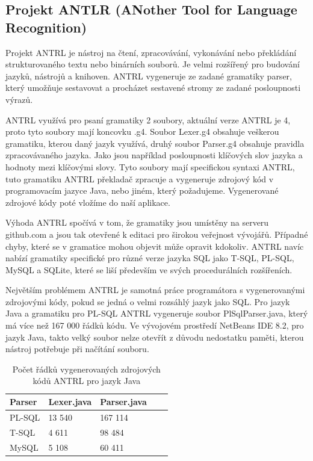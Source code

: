 \documentclass[czech,bachelor,public,dept460,male,cpdeclaration,twoside]{diploma}
\begin{document}
\subsection{Projekt ANTLR (ANother Tool for Language Recognition)}
Projekt ANTRL je nástroj na čtení, zpracovávání, vykonávání nebo překládání strukturovaného textu nebo binárních souborů. Je velmi rozšířený pro budování jazyků, nástrojů a knihoven. ANTRL vygeneruje ze zadané gramatiky parser, který umožňuje sestavovat a procházet sestavené stromy ze zadané posloupnosti výrazů. \cite{antrl}



ANTRL využívá pro psaní gramatiky 2 soubory, aktuální verze ANTRL je 4, proto tyto soubory mají koncovku .g4. Soubor Lexer.g4 obsahuje veškerou gramatiku, kterou daný jazyk využívá, druhý soubor Parser.g4 obsahuje pravidla zpracovávaného jazyka. Jako jsou například posloupnosti klíčových slov jazyka a hodnoty mezi klíčovými slovy. Tyto soubory mají specifickou syntaxi ANTRL, tuto gramatiku ANTRL překladač zpracuje a vygeneruje zdrojový kód v programovacím jazyce Java, nebo jiném, který požadujeme. Vygenerované zdrojové kódy poté vložíme do naší aplikace. \cite{antrldocs}



Výhoda ANTRL spočívá v tom, že gramatiky jsou umístěny na serveru github.com a jsou tak otevřené k editaci pro širokou veřejnost vývojářů. Případné chyby, které se v gramatice mohou objevit může opravit kdokoliv. ANTRL navíc nabízí gramatiky specifické pro různé verze jazyka SQL jako T-SQL, PL-SQL, MySQL a SQLite, které se liší především ve svých procedurálních rozšířeních. \cite{antrlg}



Největším problémem ANTRL je samotná práce programátora s vygenerovanými zdrojovými kódy, pokud se jedná o velmi rozsáhlý jazyk jako SQL. Pro jazyk Java a gramatiku pro PL-SQL ANTRL vygeneruje soubor PlSqlParser.java, který má více než 167 000 řádků kódu. Ve vývojovém prostředí NetBeans IDE 8.2, pro jazyk Java, takto velký soubor nelze otevřít z důvodu nedostatku paměti, kterou nástroj potřebuje při načítání souboru.

\begin{table}[!htbp]
	\centering
	\caption{Počet řádků vygenerovaných zdrojových kódů ANTRL pro jazyk Java}
	\label{tab:parsers}
	\begin{tabular}{lllll}
		\toprule
		Parser & Lexer.java & Parser.java\\
		\midrule
		PL-SQL & 13 540 & 167 114 \\
        T-SQL & 4 611 & 98 484 \\
        MySQL & 5 108 & 60 411 \\
		\midrule
	\end{tabular}
\end{table}
\end{document}
